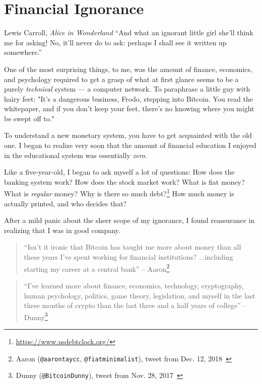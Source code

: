 \chapter{Financial Ignorance}
\label{les:8}

\begin{chapquote}{Lewis Carroll, \textit{Alice in Wonderland}}
``And what an ignorant little girl she'll think me for asking! No, it'll never
do to ask: perhaps I shall see it written up somewhere.''
\end{chapquote}

One of the most surprising things, to me, was the amount of finance,
economics, and psychology required to get a grasp of what at first
glance seems to be a purely \textit{technical} system --- a computer network.
To paraphrase a little guy with hairy feet: "It's a dangerous business,
Frodo, stepping into Bitcoin. You read the whitepaper, and if you don't
keep your feet, there's no knowing where you might be swept off to."

To understand a new monetary system, you have to get acquainted with the
old one. I began to realize very soon that the amount of financial
education I enjoyed in the educational system was essentially \textit{zero}.

Like a five-year-old, I began to ask myself a lot of questions: How does the
banking system work? How does the stock market work? What is fiat money? What is
\textit{regular} money? Why is there so much
debt?\footnote{\url{https://www.usdebtclock.org/}} How much money is actually
printed, and who decides that?

After a mild panic about the sheer scope of my ignorance, I found
reassurance in realizing that I was in good company.

\begin{quotation}
``Isn't it ironic that Bitcoin has taught me more about money than all these
years I've spent working for financial institutions? ...including starting my
career at a central bank''
\flushright -- Aaron\footnote{Aaron (\texttt{@aarontaycc}, \texttt{@fiatminimalist}), tweet from Dec.
12, 2018~\cite{aarontaycc-tweet}}
\end{quotation}

\begin{quotation}
``I've learned more about finance, economics, technology, cryptography, human
psychology, politics, game theory, legislation, and myself in the last three
months of crypto than the last three and a half years of college''
\flushright -- Dunny\footnote{Dunny (\texttt{@BitcoinDunny}), tweet from Nov. 28,
2017~\cite{bitcoindunny-tweet}}
\end{quotation}

